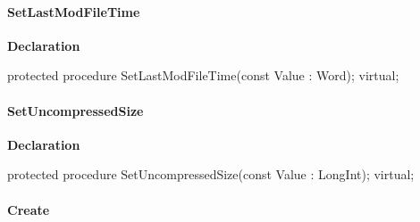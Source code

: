 \documentclass{report}
\newif\ifpdf
\begin{document}
\paragraph*{SetLastModFileTime}\hspace*{\fill}

\label{AbArcTyp.TAbArchiveItem-SetLastModFileTime}
\begin{list}{}{
\setlength{\itemindent}{0cm}
\setlength{\listparindent}{0cm}
\setlength{\leftmargin}{\evensidemargin}
\addtolength{\leftmargin}{\tmplength}
\settowidth{\labelsep}{X}
\addtolength{\leftmargin}{\labelsep}
\setlength{\labelwidth}{\tmplength}
}
\item[\textbf{Declaration}\hfill]
\ifpdf
\begin{flushleft}
\fi
\begin{ttfamily}
protected procedure SetLastModFileTime(const Value : Word); virtual;\end{ttfamily}

\ifpdf
\end{flushleft}
\fi

\end{list}
\paragraph*{SetUncompressedSize}\hspace*{\fill}

\label{AbArcTyp.TAbArchiveItem-SetUncompressedSize}
\begin{list}{}{
\setlength{\itemindent}{0cm}
\setlength{\listparindent}{0cm}
\setlength{\leftmargin}{\evensidemargin}
\addtolength{\leftmargin}{\tmplength}
\settowidth{\labelsep}{X}
\addtolength{\leftmargin}{\labelsep}
\setlength{\labelwidth}{\tmplength}
}
\item[\textbf{Declaration}\hfill]
\ifpdf
\begin{flushleft}
\fi
\begin{ttfamily}
protected procedure SetUncompressedSize(const Value : LongInt); virtual;\end{ttfamily}

\ifpdf
\end{flushleft}
\fi

\end{list}
\paragraph*{Create}\hspace*{\fill}
\end{document}
